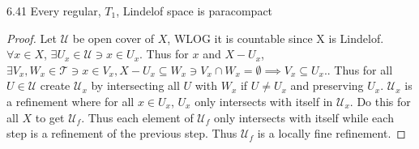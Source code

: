 \documentclass{article}
\newcommand*{\T}{\mathcal{T}}
\newcommand*{\subeq}{\subseteq}
\newcommand*{\empset}{\emptyset}
\begin{document}
\begin{claim}{6.41}\label{Claim 6.41.}
    Every regular, $T_1$, Lindelof space is paracompact 
\end{claim}
\begin{proof}
    Let $\mathcal{U}$ be open cover of $X$, WLOG it is countable since X is Lindelof. $\forall x \in X$, $\exists U_x \in \mathcal{U} \ni x \in U_x$. Thus for $x$ and $X - U_x$, $\exists V_x, W_x \in \T \ni x \in V_x, X - U_x \subeq W_x \ni V_x \cap W_x = \empset \implies V_x \subeq U_x.$. Thus for all $U \in \mathcal{U}$ create $\mathcal{U}_x$ by intersecting all $U$ with $W_x$ if $U \neq U_x$ and preserving $U_x$. $\mathcal{U}_x$ is a refinement where for all $x \in U_x$, $U_x$ only intersects with itself in $\mathcal{U}_x$. Do this for all $X$ to get $\mathcal{U}_f$. Thus each element of $\mathcal{U}_f$ only intersects with itself while each step is a refinement of the previous step. Thus $\mathcal{U}_f$ is a locally fine refinement.       
\end{proof}
\end{document}
